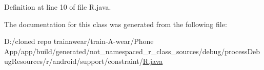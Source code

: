 Definition at line 10 of file R.\+java.


\begin{DoxyCode}{0}

\end{DoxyCode}


The documentation for this class was generated from the following file\+:\begin{DoxyCompactItemize}
\item 
D\+:/cloned repo trainawear/train-\/\+A-\/wear/\+Phone App/app/build/generated/not\+\_\+namespaced\+\_\+r\+\_\+class\+\_\+sources/debug/process\+Debug\+Resources/r/android/support/constraint/\mbox{\hyperlink{process_debug_resources_2r_2android_2support_2constraint_2_r_8java}{R.\+java}}\end{DoxyCompactItemize}
